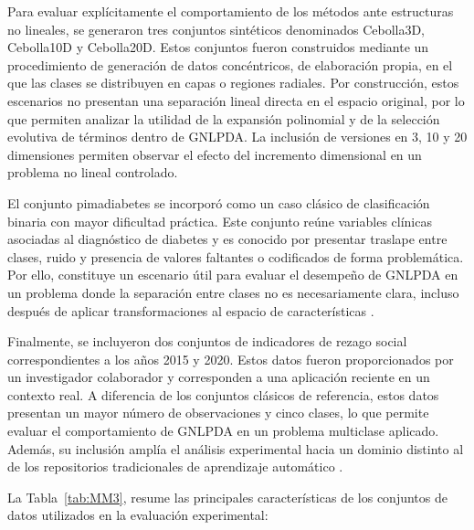 Para evaluar explícitamente el comportamiento de los métodos ante estructuras no lineales, se generaron tres conjuntos sintéticos denominados Cebolla3D, Cebolla10D y Cebolla20D. Estos conjuntos fueron construidos mediante un procedimiento de generación de datos concéntricos, de elaboración propia, en el que las clases se distribuyen en capas o regiones radiales. Por construcción, estos escenarios no presentan una separación lineal directa en el espacio original, por lo que permiten analizar la utilidad de la expansión polinomial y de la selección evolutiva de términos dentro de GNLPDA. La inclusión de versiones en 3, 10 y 20 dimensiones permiten observar el efecto del incremento dimensional en un problema no
lineal controlado.

El conjunto pimadiabetes se incorporó como un caso clásico de clasificación binaria con mayor dificultad práctica. Este conjunto reúne variables clínicas asociadas al diagnóstico de diabetes y es conocido por presentar traslape entre clases, ruido y presencia de valores faltantes o codificados de forma problemática. Por ello, constituye un escenario útil para evaluar el desempeño de GNLPDA en un problema donde la separación entre clases no es necesariamente clara, incluso después de aplicar transformaciones al espacio de características \cite{smith1988using}.

Finalmente, se incluyeron dos conjuntos de indicadores de rezago social correspondientes a los años 2015 y 2020. Estos datos fueron proporcionados por un investigador colaborador y corresponden a una aplicación reciente en un contexto real. A diferencia de los conjuntos clásicos de referencia, estos datos presentan un mayor número de observaciones y cinco clases, lo que permite evaluar el comportamiento de GNLPDA en un problema multiclase aplicado. Además, su inclusión amplía el análisis experimental hacia un dominio distinto al de los repositorios tradicionales de aprendizaje automático \cite{navarro2025bayesian}.

La Tabla~\ref{tab:MM3}, resume las principales características de los conjuntos de datos utilizados en la evaluación experimental:



